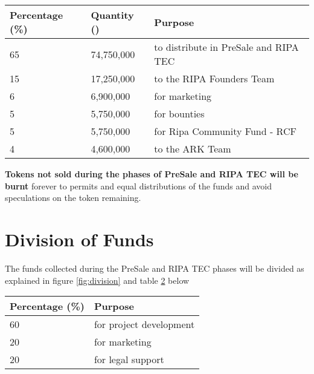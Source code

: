 \documentclass[11pt,fleqn,oneside]{book} %
\begin{document}
\vspace{5mm}
\begin{table}[H]
	\centering
	\begin{tabular}{l l l}
		\toprule
		\textbf{Percentage (\%)} & \textbf{Quantity (\PHP)} & \textbf{Purpose} \\
		\midrule
		65		& 74,750,000	& to distribute in PreSale and RIPA TEC	\\
		15      & 17,250,000	& to the RIPA Founders Team	\\
		6       & 6,900,000		& for marketing	\\
		5       & 5,750,000 	& for bounties	\\
		5       & 5,750,000		& for Ripa Community Fund - RCF	\\
		4       & 4,600,000		& to the ARK Team	\\
		\bottomrule
	\end{tabular}
	\label{tab:distribution}
\end{table}

\vspace{5mm}
\textbf{Tokens not sold during the phases of PreSale and RIPA TEC will be burnt} forever to permits and equal distributions 
of the funds and avoid speculations on the token remaining.

\section{Division of Funds}
The funds collected during the PreSale and RIPA TEC phases will be divided as explained in figure \ref{fig:division} and 
table \ref{tab:division} below

\vspace{5mm}
\label{fig:division}

\vspace{5mm}
\begin{table}[H]
	\centering
	\begin{tabular}{l l}
		\toprule
		\textbf{Percentage (\%)} & \textbf{Purpose} \\
		\midrule
		60		& for project development	\\
		20		& for marketing	\\
		20		& for legal support	\\
		\bottomrule
	\end{tabular}
	\label{tab:division}
\end{table}
\end{document}
